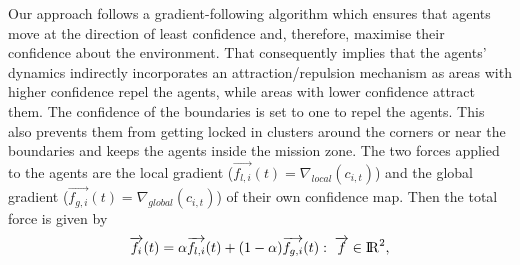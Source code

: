 \documentclass[runningheads]{llncs}%
\begin{document}
Our approach follows a gradient-following algorithm which ensures that agents move at the direction of least confidence and, therefore, maximise their confidence about the environment. That consequently implies that the agents' dynamics indirectly incorporates an attraction/repulsion mechanism as areas with higher confidence repel the agents, while areas with lower confidence attract them. The confidence of the boundaries is set to one to repel the agents. This also prevents them from getting locked in clusters around the corners or near the boundaries and keeps the agents inside the mission zone. The two forces applied to the agents are the local gradient ($\overrightarrow{f_{l,{i}}}(t) = \nabla_{local} (c_{i,t})$) and the global gradient ($\overrightarrow{f_{g,{i}}}(t) = \nabla_{global} (c_{i,t})$) of their own confidence map. Then the total force is given by
\begin{equation}
\label{eq:force}
    \overrightarrow{f_i} (t)  = \alpha \overrightarrow{f_{l,{i}}} (t) + (1 - \alpha) \overrightarrow{f_{g,{i}}}(t): \; \overrightarrow{f} \in {\rm I\!R}^2,
\end{equation}
\end{document}
